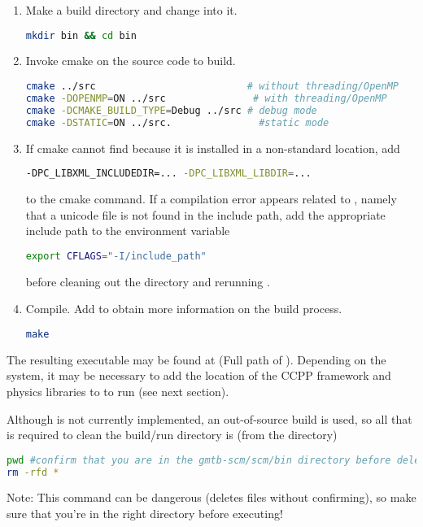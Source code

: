 \begin{enumerate}
    \item Make a build directory and change into it.
\begin{lstlisting}[language=bash]
mkdir bin && cd bin
\end{lstlisting}
    \item Invoke cmake on the source code to build.
\begin{lstlisting}[language=bash]
cmake ../src                          # without threading/OpenMP
cmake -DOPENMP=ON ../src               # with threading/OpenMP
cmake -DCMAKE_BUILD_TYPE=Debug ../src # debug mode
cmake -DSTATIC=ON ../src.               #static mode
\end{lstlisting}
    \item If cmake cannot find  because it is installed in a non-standard location, add
\begin{lstlisting}[language=bash]
-DPC_LIBXML_INCLUDEDIR=... -DPC_LIBXML_LIBDIR=...
\end{lstlisting}
    to the cmake command. If a compilation error appears related to , namely that a unicode file is not found in the include path, add the appropriate include path to the  environment variable
\begin{lstlisting}[language=bash]
export CFLAGS="-I/include_path"
\end{lstlisting} before cleaning out the  directory and rerunning .
    \item Compile. Add  to obtain more information on the build process.
\begin{lstlisting}[language=bash]
make
\end{lstlisting}
\end{enumerate}

The resulting executable may be found at  (Full path of ). Depending on the system, it may be necessary to add the location of the CCPP framework and physics libraries to  to run  (see next section).

Although  is not currently implemented, an out-of-source build is used, so all that is required to clean the build/run directory is (from the  directory)
\begin{lstlisting}[language=bash]
pwd #confirm that you are in the gmtb-scm/scm/bin directory before deleting files
rm -rfd *
\end{lstlisting}
Note: This command can be dangerous (deletes files without confirming), so make sure that you're in the right directory before executing!

